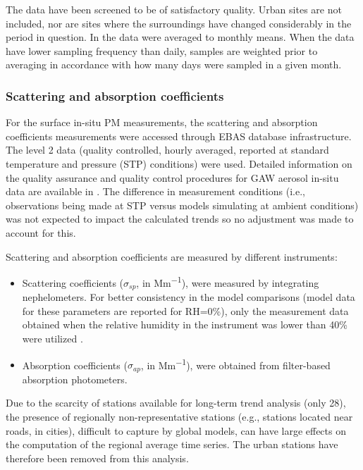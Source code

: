 \documentclass[acp, manuscript]{copernicus}
\begin{document}
The data have been screened to be of satisfactory quality. Urban sites are not included, nor are sites where the surroundings have changed considerably in the period in question.
In \cite{aas2019global} the data  were averaged to monthly means.  When the data have lower sampling frequency than daily, samples are weighted prior to averaging in accordance with how many days were sampled in a given month.

\subsubsection{Scattering and absorption coefficients}
For the surface in-situ PM measurements, the scattering and absorption coefficients measurements were accessed through EBAS database infrastructure. The level 2 data (quality controlled, hourly averaged, reported at standard temperature and pressure (STP) conditions) were used. Detailed information on the quality assurance and quality control procedures for GAW aerosol in-situ data are available in \citep{laj-2019-499}.  The difference in measurement conditions (i.e., observations being made at STP versus models simulating at ambient conditions) was not expected to impact the calculated trends so no adjustment was made to account for this.  

  Scattering and absorption coefficients are measured by different instruments:

\begin{itemize}
 \item Scattering coefficients ($\sigma_{sp}$, in \unit{Mm^{-1}}), were measured by integrating nephelometers. For better consistency in the model comparisons (model data for these parameters are reported for RH=0\%), only the measurement data obtained when the relative humidity in the instrument was lower than 40\% were utilized \citep{pandolfi2018european}.
 \item Absorption coefficients ($\sigma_{ap}$, in \unit{Mm^{-1}}), were obtained from filter-based absorption photometers.
\end{itemize}

Due to the scarcity of stations available for long-term trend analysis (only 28), the presence of regionally non-representative stations (e.g., stations located near roads, in cities), difficult to capture by global models, can have large effects on the computation of the regional average time series. The urban stations have therefore been removed from this analysis. 
\end{document}
